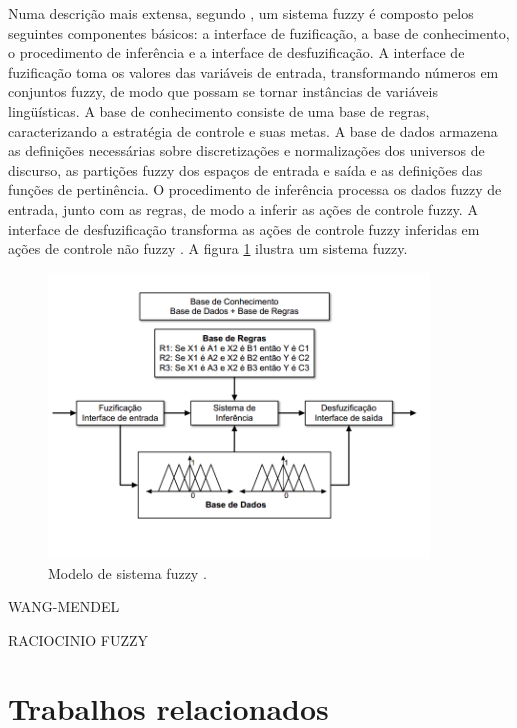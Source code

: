 \documentclass[template.tex]{subfiles}
\begin{document}
Numa descrição mais extensa, segundo \cite{gomide1995conceitos}, um sistema fuzzy é composto pelos seguintes componentes básicos: a interface de fuzificação, a base de conhecimento, o procedimento de inferência e a interface de desfuzificação. A interface de fuzificação toma os valores das variáveis de entrada, transformando números em conjuntos fuzzy, de modo que possam se tornar instâncias de variáveis lingüísticas. A base de conhecimento consiste de uma base de regras, caracterizando a estratégia de controle e suas metas. A base de dados armazena as definições necessárias sobre discretizações e normalizações dos universos de discurso, as partições fuzzy dos espaços de entrada e saída e as definições das funções de pertinência. O procedimento de inferência processa os dados fuzzy de entrada, junto com as regras, de modo a inferir as ações de controle fuzzy. A interface de desfuzificação transforma as ações de controle fuzzy inferidas em ações de controle não fuzzy \cite{gomide1995conceitos}. A figura \ref{fig:sistema_nebuloso} ilustra um sistema fuzzy.

\begin{figure}[!ht]  
  \caption{Modelo de sistema fuzzy \cite{herrera2008genetic}.}
  \label{fig:sistema_nebuloso}
  \centering
    \includegraphics[width=0.9\textwidth]{sistema_nebuloso}
\end{figure}

WANG-MENDEL

RACIOCINIO FUZZY

\section{Trabalhos relacionados}

\end{document}
